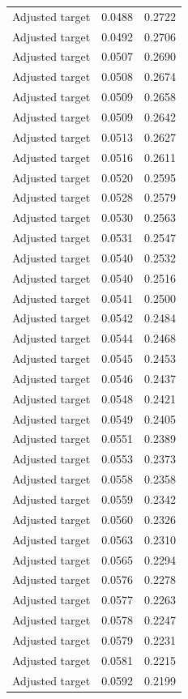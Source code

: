 \begin{table}[htbp]
\begin{tabular}{lll}
Adjusted target & 0.0488 & 0.2722 \\
Adjusted target & 0.0492 & 0.2706 \\
Adjusted target & 0.0507 & 0.2690 \\
Adjusted target & 0.0508 & 0.2674 \\
Adjusted target & 0.0509 & 0.2658 \\
Adjusted target & 0.0509 & 0.2642 \\
Adjusted target & 0.0513 & 0.2627 \\
Adjusted target & 0.0516 & 0.2611 \\
Adjusted target & 0.0520 & 0.2595 \\
Adjusted target & 0.0528 & 0.2579 \\
Adjusted target & 0.0530 & 0.2563 \\
Adjusted target & 0.0531 & 0.2547 \\
Adjusted target & 0.0540 & 0.2532 \\
Adjusted target & 0.0540 & 0.2516 \\
Adjusted target & 0.0541 & 0.2500 \\
Adjusted target & 0.0542 & 0.2484 \\
Adjusted target & 0.0544 & 0.2468 \\
Adjusted target & 0.0545 & 0.2453 \\
Adjusted target & 0.0546 & 0.2437 \\
Adjusted target & 0.0548 & 0.2421 \\
Adjusted target & 0.0549 & 0.2405 \\
Adjusted target & 0.0551 & 0.2389 \\
Adjusted target & 0.0553 & 0.2373 \\
Adjusted target & 0.0558 & 0.2358 \\
Adjusted target & 0.0559 & 0.2342 \\
Adjusted target & 0.0560 & 0.2326 \\
Adjusted target & 0.0563 & 0.2310 \\
Adjusted target & 0.0565 & 0.2294 \\
Adjusted target & 0.0576 & 0.2278 \\
Adjusted target & 0.0577 & 0.2263 \\
Adjusted target & 0.0578 & 0.2247 \\
Adjusted target & 0.0579 & 0.2231 \\
Adjusted target & 0.0581 & 0.2215 \\
Adjusted target & 0.0592 & 0.2199 \\

\end{tabular}
\end{table}
